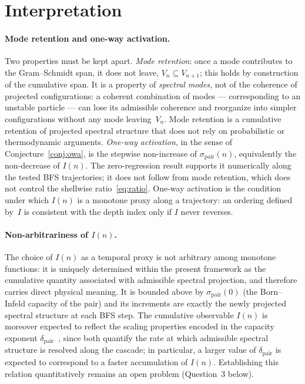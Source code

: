 \documentclass[11pt,a4paper]{article}
\begin{document}
  \section{Interpretation}

  \paragraph{Mode retention and one-way activation.}
    Two properties must be kept apart.
    \emph{Mode retention}: once a mode contributes to the Gram--Schmidt span,
    it does not leave, $V_n \subseteq V_{n+1}$; this holds by construction of
    the cumulative span.
    It is a property of \emph{spectral modes}, not of the
    coherence of projected configurations: a coherent combination of modes
    --- corresponding to an unstable particle --- can lose its admissible
    coherence and reorganize into simpler configurations without any mode
    leaving~$V_n$.
    Mode retention is a cumulative retention of projected spectral structure
    that does not rely on probabilistic or thermodynamic arguments.
    \emph{One-way activation}, in the sense of Conjecture~\ref{conj:owa}, is the
    stepwise non-increase of $\sigma_{\mathrm{pair}}(n)$, equivalently the
    non-decrease of $I(n)$.
    The zero-regression result supports it numerically along the tested BFS
    trajectories; it does not follow from mode retention, which does not control
    the shellwise ratio~\eqref{eq:ratio}.
    One-way activation is the condition under which $I(n)$ is a monotone proxy
    along a trajectory: an ordering defined by~$I$ is consistent with the depth
    index only if $I$ never reverses.

  \paragraph{Non-arbitrariness of $I(n)$.}
    The choice of $I(n)$ as a temporal proxy is not arbitrary among monotone
    functions: it is uniquely determined within the present framework as the
    cumulative quantity associated with admissible spectral projection, and
    therefore carries direct physical meaning.
    It is bounded above by $\sigma_{\mathrm{pair}}(0)$ (the Born--Infeld
    capacity of the pair) and its increments are exactly the newly projected
    spectral structure at each BFS step.
    The cumulative observable $I(n)$ is moreover expected to reflect the
    scaling properties encoded in the capacity exponent
    $\delta_{\mathrm{pair}}$~\cite{Beau2026a29}, since both quantify the
    rate at which admissible spectral structure is resolved along the
    cascade; in particular, a larger value of $\delta_{\mathrm{pair}}$ is
    expected to correspond to a faster accumulation of $I(n)$.
    Establishing this relation quantitatively remains an open problem
    (Question~3 below).
\end{document}
